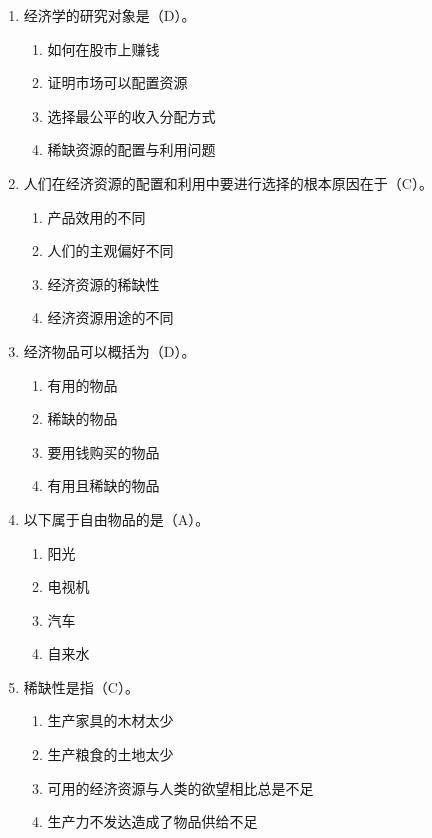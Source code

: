 \documentclass{article}
\begin{document}
\begin{enumerate}[label={\arabic*.}]
    \item 经济学的研究对象是（D）。
    \begin{enumerate}[label={\Alph*.},topsep=0pt,itemsep=0pt]
        \item 如何在股市上赚钱
        \item 证明市场可以配置资源
        \item 选择最公平的收入分配方式
        \item 稀缺资源的配置与利用问题
    \end{enumerate}

    \item 人们在经济资源的配置和利用中要进行选择的根本原因在于（C）。
    \begin{enumerate}[label={\Alph*.},topsep=0pt,itemsep=0pt]
        \item 产品效用的不同
        \item 人们的主观偏好不同
        \item 经济资源的稀缺性
        \item 经济资源用途的不同
    \end{enumerate}

    \item 经济物品可以概括为（D）。
    \begin{enumerate}[label={\Alph*.},topsep=0pt,itemsep=0pt]
        \item 有用的物品
        \item 稀缺的物品
        \item 要用钱购买的物品
        \item 有用且稀缺的物品
    \end{enumerate}

    \item 以下属于自由物品的是（A）。
    \begin{enumerate}[label={\Alph*.},topsep=0pt,itemsep=0pt]
        \item 阳光
        \item 电视机
        \item 汽车
        \item 自来水
    \end{enumerate}

    \item 稀缺性是指（C）。
    \begin{enumerate}[label={\Alph*.},topsep=0pt,itemsep=0pt]
        \item 生产家具的木材太少
        \item 生产粮食的土地太少
        \item 可用的经济资源与人类的欲望相比总是不足
        \item 生产力不发达造成了物品供给不足
    \end{enumerate}


\end{enumerate}
\end{document}
